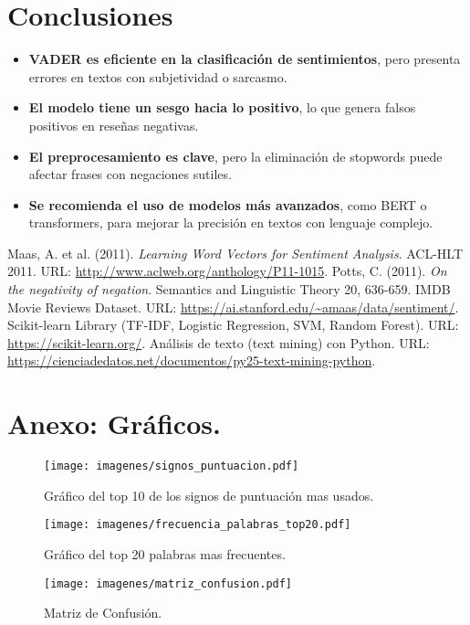 \documentclass[conference]{IEEEtran}
\begin{document}
\section{Conclusiones}

\begin{itemize}
    \item \textbf{VADER es eficiente en la clasificación de sentimientos}, pero presenta errores en textos con subjetividad o sarcasmo.
    \item \textbf{El modelo tiene un sesgo hacia lo positivo}, lo que genera falsos positivos en reseñas negativas.
    \item \textbf{El preprocesamiento es clave}, pero la eliminación de stopwords puede afectar frases con negaciones sutiles.
    \item \textbf{Se recomienda el uso de modelos más avanzados}, como BERT o transformers, para mejorar la precisión en textos con lenguaje complejo.
\end{itemize}




\begin{thebibliography}{9}
     Maas, A. et al. (2011). \textit{Learning Word Vectors for Sentiment Analysis}. ACL-HLT 2011. URL: \url{http://www.aclweb.org/anthology/P11-1015}.
     Potts, C. (2011). \textit{On the negativity of negation}. Semantics and Linguistic Theory 20, 636-659.
     IMDB Movie Reviews Dataset. URL: \url{https://ai.stanford.edu/~amaas/data/sentiment/}.
     Scikit-learn Library (TF-IDF, Logistic Regression, SVM, Random Forest). URL: \url{https://scikit-learn.org/}.
     Análisis de texto (text mining) con Python. URL: \url{https://cienciadedatos.net/documentos/py25-text-mining-python}.
\end{thebibliography}

\newpage 
\onecolumn

\section{Anexo: Gráficos.}


\begin{figure}[h]
    \centering
    \texttt{[image: imagenes/signos\_puntuacion.pdf]}
    \caption{Gráfico del top 10 de los signos de puntuación mas usados.}
    \label{fig:signos_puntuacion}
\end{figure}

\FloatBarrier

\begin{figure}[h]
    \centering
    \texttt{[image: imagenes/frecuencia\_palabras\_top20.pdf]}
    \caption{Gráfico del top 20 palabras mas frecuentes.}
    \label{fig:frecuencia_palabras_top20}
\end{figure}


\begin{figure}[h]
    \centering
    \texttt{[image: imagenes/matriz\_confusion.pdf]}
    \caption{Matriz de Confusión.}
    \label{fig:matriz_confusion}
\end{figure}
\end{document}
